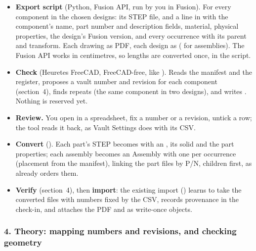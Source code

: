 \begin{itemize}[nosep]
  \item \textbf{Export script} (Python, Fusion API, run by you in Fusion). For every component in the chosen designs:
        its STEP file, and a line in  with the component's name, part number and description fields,
        material, physical properties, the design's Fusion version, and every occurrence with its parent and transform.
        Each drawing as PDF, each design as  ( for assemblies). The Fusion API works in
        centimetres, so lengths are converted once, in the script.
  \item \textbf{Check} (Heuretes FreeCAD, FreeCAD-free, like ). Reads the manifest and the register,
        proposes a vault number and revision for each component (section~4), finds repeats (the same component in two
        designs), and writes . Nothing is reserved yet.
  \item \textbf{Review.} You open  in a spreadsheet, fix a number or a revision, untick a row; the
        tool reads it back, as Vault Settings does with its CSV.
  \item \textbf{Convert} (). Each part's STEP becomes  with an ,
        its solid and the part properties; each assembly becomes an Assembly with one  per occurrence
        (placement from the manifest), linking the part files by P/N, children first, as  already
        orders them.
  \item \textbf{Verify} (section~4), then \textbf{import}: the existing import () learns to take the
        converted files with numbers fixed by the CSV, records provenance in the check-in, and attaches the PDF and
         as write-once objects.
\end{itemize}

\subsubsection*{4. Theory: mapping numbers and revisions, and checking geometry}

